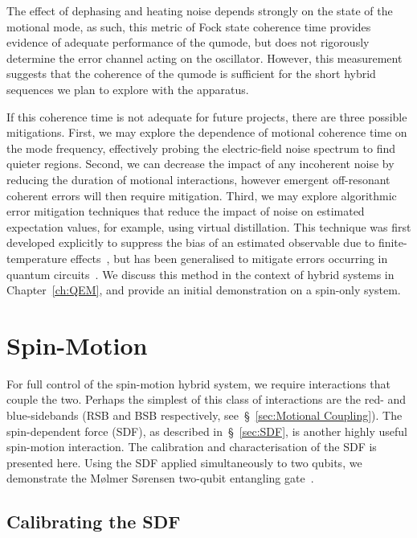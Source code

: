     The effect of dephasing and heating noise depends strongly on the state of
    the motional mode, as such, this metric of Fock state coherence time
    provides evidence of adequate performance of the qumode, but does not
    rigorously determine the error channel acting on the oscillator.
    However, this measurement suggests that the coherence of the qumode is
    sufficient for the short hybrid sequences we plan to explore with the
    apparatus. 

    If this coherence time is not adequate for future projects, there are three
    possible mitigations. First, we may explore the dependence of motional coherence time on the mode frequency, effectively probing the electric-field noise
    spectrum to find quieter regions. Second, we can decrease the impact of any
    incoherent noise by reducing the duration of motional interactions, however
    emergent off-resonant coherent errors will then require mitigation. Third,
    we may explore algorithmic error mitigation techniques that reduce the
    impact of noise on estimated expectation values, for example, using virtual
    distillation. This technique was first developed explicitly to suppress the
    bias of an estimated observable due to finite-temperature
    effects~\cite{cotler_quantum_2019}, but has been generalised to mitigate errors occurring in quantum circuits~\cite{huggins_virtual_2021,koczor_exponential_2021}.  We discuss
    this method in the context of hybrid systems in Chapter~\ref{ch:QEM}, and
    provide an initial demonstration on a spin-only system.



\section{Spin-Motion}
    For full control of the spin-motion hybrid system, we require interactions
    that couple the two. Perhaps the simplest of this class of interactions
    are the red- and blue-sidebands (RSB and BSB respectively,
    see~\S~\ref{sec:Motional Coupling}). The spin-dependent force (SDF), as
    described in~\S~\ref{sec:SDF}, is another highly useful spin-motion
    interaction. The calibration and characterisation of the SDF is presented
    here. Using the SDF applied simultaneously to two qubits, we demonstrate the
    M{\o}lmer S{\o}rensen two-qubit entangling
    gate~\cite{molmer_multiparticle_1999}. 

\subsection{Calibrating the SDF}
\label{sec:SDF_Calib}


